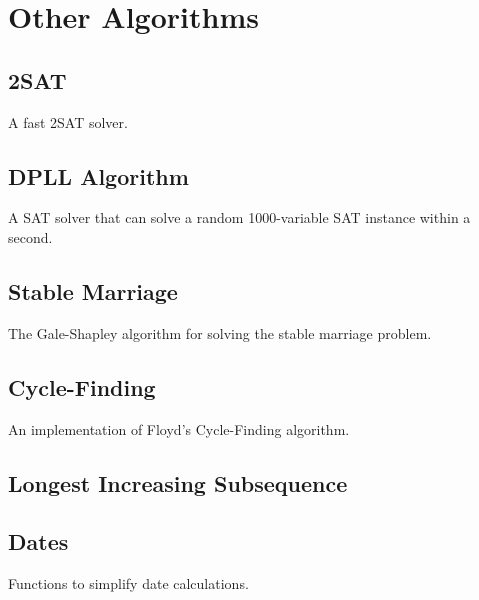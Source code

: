 \section{Other Algorithms}
  \subsection{2SAT}
    \ifverbose
    A fast 2SAT solver.
    \fi
  \subsection{DPLL Algorithm}
    A SAT solver that can solve a random 1000-variable SAT instance within a second.
  \subsection{Stable Marriage}
    \ifverbose
    The Gale-Shapley algorithm for solving the stable marriage problem.
    \fi
\begin{comment}
  \subsection{Algorithm X}
    \ifverbose
    An implementation of Knuth's Algorithm X, using dancing links. Solves the Exact Cover problem.
    \fi
    \code{other/algorithm_x.cpp}
  \subsection{Matroid Intersection}
    Computes the maximum weight and cardinality intersection of two
    matroids, specified by implementing the required abstract methods, in
    $O(n^3(M_1+M_2))$.
    \code{other/matroid_intersection.cpp}
\end{comment}
  \subsection{Cycle-Finding}
    \ifverbose
    An implementation of Floyd's Cycle-Finding algorithm.
    \fi
  \subsection{Longest Increasing Subsequence}
  \subsection{Dates}
    \ifverbose
    Functions to simplify date calculations.
    \fi
